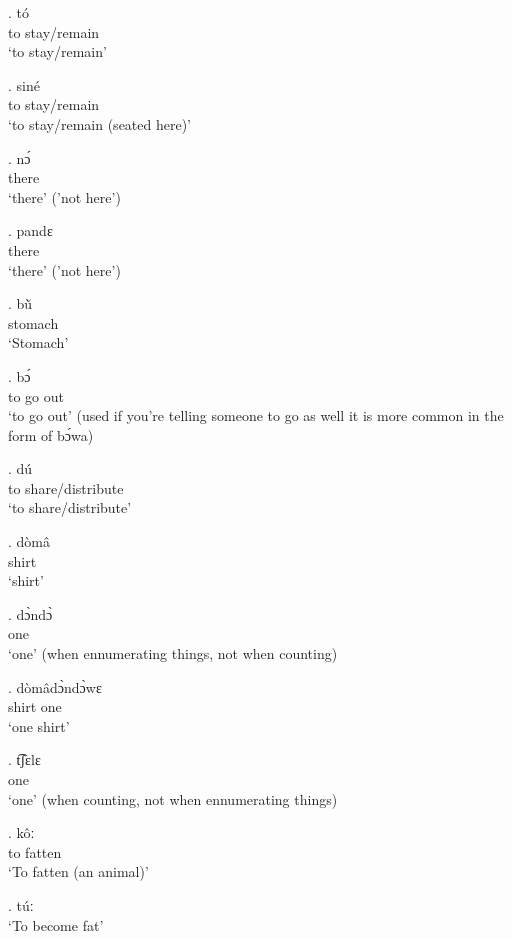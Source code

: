 \documentclass{assets/fieldnotes}
\begin{document}
\exg. tó \\
to stay/remain\\
`to stay/remain' 

\exg. siné \\
to stay/remain\\
`to stay/remain (seated here)'

\exg. nɔ́ \\
there\\
`there' ('not here') 

\exg. pandɛ \\
there\\
`there' ('not here')

\exg. bù̆ \\
stomach\\
`Stomach'

\exg. bɔ́ \\
to go out\\
`to go out' (used if you're telling someone to go as well it is more common in the form of bɔ́wa)

\exg. dú \\
to share/distribute\\
`to share/distribute'

\exg. dòmâ \\
shirt\\
`shirt'

\exg. dɔ̀ndɔ̀ \\
one\\
`one' (when ennumerating things, not when counting)

\exg. dòmâdɔ̀ndɔ̀wɛ \\
shirt one\\
`one shirt'

\exg. t͡ʃɛlɛ \\
one\\
`one' (when counting, not when ennumerating things)




\exg. kôː \\
to fatten\\
`To fatten (an animal)'

\ex. túː \\
`To become fat'\\
\end{document}
